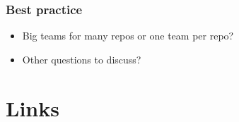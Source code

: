 \documentclass[aspectratio=169]{beamer} %
\begin{document}
\begin{frame}
	\frametitle{Best practice}
	
	\begin{itemize}
		\item Big teams for many repos or one team per repo?
		\item Other questions to discuss?
	\end{itemize}
	
\end{frame}


\section{Links}




\end{document}
